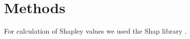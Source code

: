 \section{Methods}

For calculation of Shapley values we used the Shap library \cite{lundberg_unified_2017}.